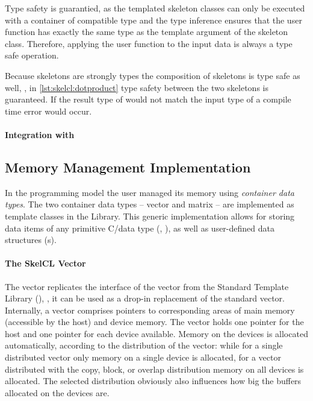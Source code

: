 Type safety is guarantied, as the templated skeleton classes can only be executed with a container of compatible type and the type inference ensures that the user function has exactly the same type as the template argument of the skeleton class.
Therefore, applying the user function to the input data is always a type safe operation.

Because skeletons are strongly types the composition of skeletons is type safe as well, \ie, in \autoref{lst:skelcl:dotproduct} type safety between the two skeletons is guaranteed.
If the result type of  would not match the input type of  a compile time error would occur.

\paragraph{Integration with \Cpp}


\subsection{Memory Management Implementation}
\label{section:skelcl-library:memory-management}
In the \SkelCL programming model the user managed its memory using \emph{container data types}.
The two container data types -- vector and matrix -- are implemented as template classes in the \SkelCL Library.
This generic implementation allows for storing data items of any primitive C/\Cpp data type (\eg, ), as well as user-defined data structures (s).

\paragraph{The SkelCL Vector}
The \SkelCL vector replicates the interface of the vector from the Standard Template Library (\STL), \ie, it can be used as a drop-in replacement of the standard vector.
Internally, a vector comprises pointers to corresponding areas of main memory (accessible by the host) and device memory.
The vector holds one pointer for the host and one pointer for each device available.
Memory on the devices is allocated automatically, according to the distribution of the vector:
while for a single distributed vector only memory on a single device is allocated, for a vector distributed with the copy, block, or overlap distribution memory on all devices is allocated.
The selected distribution obviously also influences how big the buffers allocated on the devices are.

